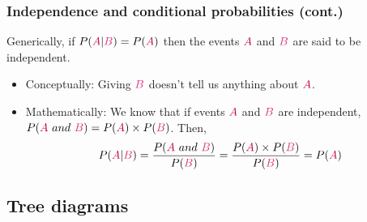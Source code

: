 \documentclass[notes,11pt, aspectratio=169]{beamer}
\begin{document}
\begin{frame}
\frametitle{Independence and conditional probabilities (cont.)}

Generically, if $P(\textcolor{purple}{A}|\textcolor{pink}{B}) = P(\textcolor{purple}{A})$ then the events $\textcolor{purple}{A}$ and $\textcolor{pink}{B}$ are said to be independent.

\pause

\begin{itemize}

\item Conceptually: Giving $\textcolor{pink}{B}$ doesn't tell us anything about $\textcolor{purple}{A}$.

\pause

\item Mathematically: We know that if events $\textcolor{purple}{A}$ and $\textcolor{pink}{B}$ are independent, $P(\textcolor{purple}{A}~and~\textcolor{pink}{B}) = P(\textcolor{purple}{A}) \times P(\textcolor{pink}{B})$. Then,
\[ P(\textcolor{purple}{A}|\textcolor{pink}{B}) = \frac{P(\textcolor{purple}{A}~and~\textcolor{pink}{B})}{P(\textcolor{pink}{B})} = \frac{P(\textcolor{purple}{A}) \times P(\textcolor{pink}{B})}{P(\textcolor{pink}{B})} = P(\textcolor{purple}{A}) \]

\end{itemize}

\end{frame}


\subsection{Tree diagrams}

\end{document}
